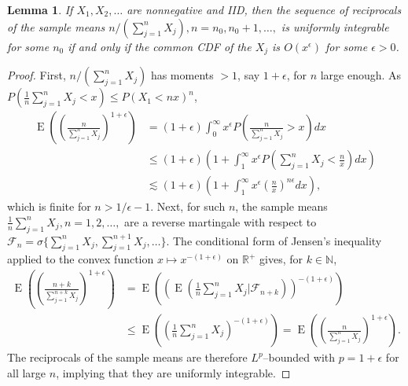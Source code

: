 \documentclass[12pt]{article}
\renewcommand{\P}{P}
\newtheorem{lemma}{Lemma}
\newcommand{\x}{X}
\DeclareMathOperator{\E}{E}
\begin{document}
  \begin{lemma}\label{lemma:1}
    If $\x_1,\x_2,\ldots$ are nonnegative and IID, then the sequence
    of reciprocals of the sample means
    $n/(\sum_{j=1}^n\x_j),n=n_0,n_0+1,\ldots,$ is uniformly integrable
    for some $n_0$ if and only if the common CDF of the $\x_j$ is
    $O(x^\epsilon)$ for some $\epsilon>0$.
  \end{lemma}

  \begin{proof}
    First, $n/(\sum_{j=1}^n\x_j)$ has moments $>1$, say $1+\epsilon$, for $n$ large enough. As $\P(\frac{1}{n}\sum_{j=1}^n\x_j<x)\le \P(\x_1<nx)^n$,
    \begin{align}
      \E\left(\left(\frac{n}{\sum_{j=1}^n\x_j}\right)^{1+\epsilon}\right) &=
                                                      (1+\epsilon)\int_0^\infty x^\epsilon\P\left(\frac{n}{\sum_{j=1}^n\x_j}>x\right)dx\\
                                                    &\le(1+\epsilon)\left(1+\int_1^\infty x^\epsilon\P\left(\sum_{j=1}^n\x_j<\frac{n}{x}\right)dx\right)\\
                                                    &\lesssim (1+\epsilon)\left(1+\int_1^\infty x^\epsilon\left(\frac{n}{x}\right)^{n\epsilon}dx\right),
    \end{align}
    which is finite for $n > 1/\epsilon-1$.
    Next, for such $n$,  the sample means $\frac{1}{n}\sum_{j=1}^n\x_j,n=1,2,\ldots,$ are a reverse martingale with respect to $\mathcal{F}_n=\sigma\{\sum_{j=1}^n\x_j,\sum_{j=1}^{n+1}\x_j,\ldots\}$. The conditional form of Jensen's inequality applied to the convex function $x\mapsto x^{-(1+\epsilon)}$ on $\mathbb{R}^+$ gives, for $k\in\mathbb{N}$,
    \begin{align}
      \E\left(\left(\frac{n+k}{\sum_{j=1}^{n+k}\x_j}\right)^{1+\epsilon}\right) &= \E\left(\left(\E\left(\frac{1}{n}\sum_{j=1}^n\x_j\bigg\vert\mathcal{F}_{n+k}\right)\right)^{-(1+\epsilon)}\right)\\
                                                                                &\le \E\left(\left(\frac{1}{n}\sum_{j=1}^n\x_j\right)^{-(1+\epsilon)}\right) =
                                                                                  \E\left(\left(\frac{n}{\sum_{j=1}^{n}\x_j}\right)^{1+\epsilon}\right).
    \end{align}
    The reciprocals of the sample means are therefore $L^p$--bounded with $p=1+\epsilon$ for all large $n$, implying that they are uniformly integrable.


\end{proof}
\end{document}

